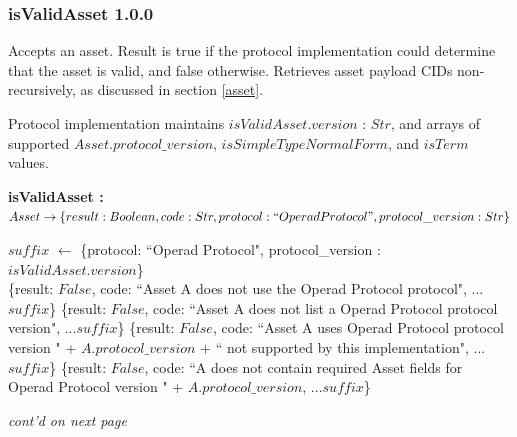 \documentclass[9pt, oneside]{article}   	%
\begin{document}
\subsubsection{isValidAsset 1.0.0}\label{isValidAsset_code}

Accepts an asset. Result is true if the protocol implementation could determine that the asset is valid, and false otherwise. Retrieves asset payload CIDs non-recursively, as discussed in section \ref{asset}.

Protocol implementation maintains $isValidAsset.version$ : $Str$, and arrays of supported $Asset.protocol\_version$, $isSimpleTypeNormalForm$, and $isTerm$ values.

\vspace{.25 cm}
\begin{algorithm}[H]
\setcounter{AlgoLine}{0}
\caption{\textbf{isValidAsset : \\ $Asset \rightarrow \{result: Boolean, code: Str, protocol: ``Operad Protocol", protocol\_version : Str\}$}}
\label{algo_isValidAsset}
\SetAlgoLined
$suffix$ $\leftarrow$ \{protocol: ``Operad Protocol", protocol\_version : $isValidAsset.version$\} \\
{
		{\Return \{result: $False$, code: ``Asset A does not use the Operad Protocol protocol", ...$suffix$\}}
		{\Return \{result: $False$, code: ``Asset A does not list a Operad Protocol protocol version", ...$suffix$\}}
		{\Return \{result: $False$, code: ``Asset A uses Operad Protocol protocol version " + $A.protocol\_version$ + `` not supported by this implementation", ...$suffix$\}}
		{\Return \{result: $False$, code: ``A does not contain required Asset fields for Operad Protocol version " + $A.protocol\_version$, ...$suffix$\}}
		}
\end{algorithm}
\textit{cont'd on next page}
\end{document}
